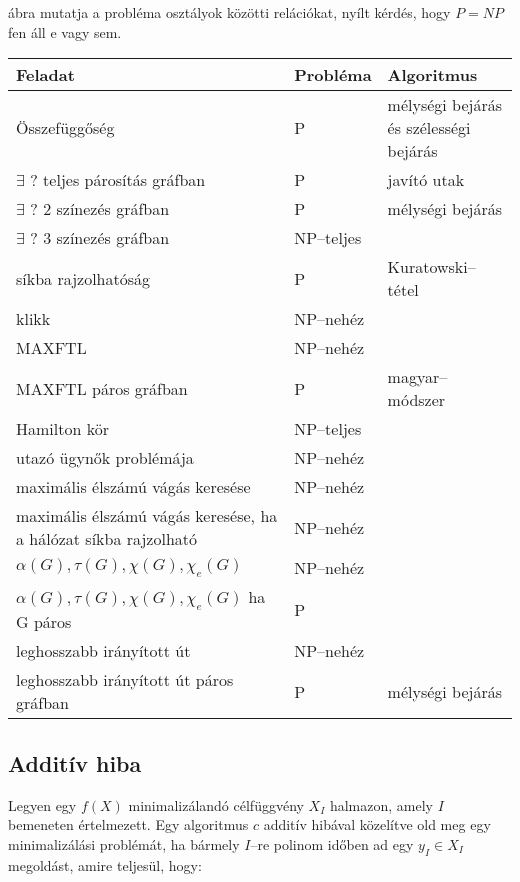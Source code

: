  ábra mutatja a probléma osztályok közötti relációkat, nyílt
kérdés, hogy $P=NP$ fen áll e vagy sem.

\begin{table}
\begin{tabular}{|m{6.5cm}|m{2cm}|m{3.5cm}|}
\hline
Feladat & Probléma & Algoritmus \\
\hline\arrayrulecolor{lightgray}
Összefüggőség & P & mélységi bejárás és szélességi bejárás \\  \hline
$\exists$ ? teljes párosítás gráfban & P & javító utak \\\hline
$\exists$ ? $2$ színezés gráfban & P & mélységi bejárás \\\hline
$\exists$ ? $3$ színezés gráfban & NP--teljes &\\\hline
síkba rajzolhatóság & P & Kuratowski--tétel\\\hline
klikk & NP--nehéz & \\\hline
MAXFTL & NP--nehéz &\\\hline
MAXFTL páros gráfban & P & magyar--módszer\\\hline
Hamilton kör & NP--teljes & \\\hline
utazó ügynők problémája & NP--nehéz & \\\hline
maximális élszámú vágás keresése & NP--nehéz &\\\hline
maximális élszámú vágás keresése, ha a hálózat síkba rajzolható& NP--nehéz &\\\hline
$\alpha(G), \tau(G), \chi(G), \chi_e(G)$ & NP--nehéz & \\\hline
$\alpha(G), \tau(G), \chi(G), \chi_e(G)$ ha G páros & P & \\\hline
leghosszabb irányított út & NP--nehéz & \\\hline
leghosszabb irányított út páros gráfban & P & mélységi bejárás \\
\hline
\end{tabular}
\end{table}

\subsection{Additív hiba}

Legyen egy $f(X)$ minimalizálandó célfüggvény $X_I$ halmazon, amely $I$ bemeneten 
értelmezett. Egy algoritmus $c$ additív hibával közelítve old meg egy minimalizálási 
problémát, ha bármely $I$--re polinom időben ad egy $y_I \in X_I$ megoldást, amire teljesül, hogy:

